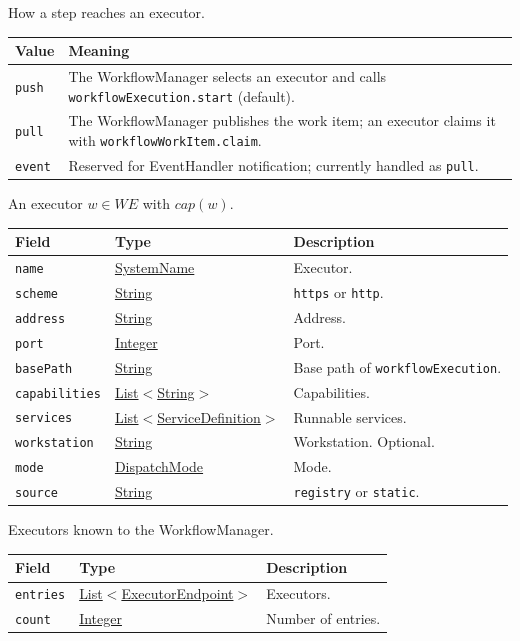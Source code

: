 \documentclass[a4paper]{arrowhead}
\newcommand{\mref}[1]{{\textcolor{ArrowheadPurple}{\hyperref[sec:model:#1]{#1}}}}
\newcommand{\pref}[1]{{\textcolor{ArrowheadGrey}{\hyperref[sec:model:primitives:#1]{#1}}}}
\begin{document}
How a step reaches an executor.

{\small
\begin{longtable}{|p{3.9cm}|p{11.9cm}|}

\hline
\rowcolor{gray!33} Value & Meaning \\ \hline
\endhead
\texttt{push} & The WorkflowManager selects an executor and calls \texttt{workflowExecution.start} (default). \\ \hline
\texttt{pull} & The WorkflowManager publishes the work item; an executor claims it with \texttt{workflowWorkItem.claim}. \\ \hline
\texttt{event} & Reserved for EventHandler notification; currently handled as \texttt{pull}. \\ \hline
\end{longtable}
}

An executor $w \in WE$ with $cap(w)$.

{\small
\begin{longtable}{|p{3.9cm}|p{4.4cm}|p{7.5cm}|}

\hline
\rowcolor{gray!33} Field & Type & Description \\ \hline
\endhead
\texttt{name} & \pref{SystemName} & Executor. \\ \hline
\texttt{scheme} & \pref{String} & \texttt{https} or \texttt{http}. \\ \hline
\texttt{address} & \pref{String} & Address. \\ \hline
\texttt{port} & \pref{Integer} & Port. \\ \hline
\texttt{basePath} & \pref{String} & Base path of \texttt{workflowExecution}. \\ \hline
\texttt{capabilities} & \pref{List}$<$\pref{String}$>$ & Capabilities. \\ \hline
\texttt{services} & \pref{List}$<$\pref{ServiceDefinition}$>$ & Runnable services. \\ \hline
\texttt{workstation} & \pref{String} & Workstation. Optional. \\ \hline
\texttt{mode} & \mref{DispatchMode} & Mode. \\ \hline
\texttt{source} & \pref{String} & \texttt{registry} or \texttt{static}. \\ \hline
\end{longtable}
}

Executors known to the WorkflowManager.

{\small
\begin{longtable}{|p{3.9cm}|p{4.4cm}|p{7.5cm}|}

\hline
\rowcolor{gray!33} Field & Type & Description \\ \hline
\endhead
\texttt{entries} & \pref{List}$<$\mref{ExecutorEndpoint}$>$ & Executors. \\ \hline
\texttt{count} & \pref{Integer} & Number of entries. \\ \hline
\end{longtable}
}
\end{document}
